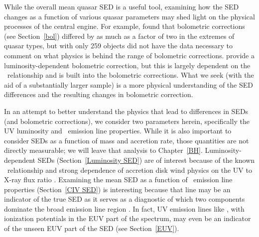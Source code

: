 While the overall mean quasar SED is a useful tool, examining how the SED changes as a function of various quasar parameters may shed light on the physical processes of the central engine.  For example, \citet{Richards:2006} found that bolometric corrections (see Section~\ref{bol}) differed by as much as a factor of two in the extremes of quasar types, but with only 259 objects \citet{Richards:2006} did not have the data necessary to comment on what physics is behind the range of bolometric corrections.
\citet{Marconi:2004} provide a luminosity-dependent bolometric correction, but this is largely dependent on the  \luvaox\ relationship and is built into the \citet{Richards:2006} bolometric corrections.  What we seek (with the aid of a substantially larger sample) is a more physical understanding of the SED differences and the resulting changes in bolometric correction.  

In an attempt to better understand the physics that lead to differences in SEDs (and bolometric corrections), we consider two parameters herein, specifically the UV luminosity and \civ\ emission line properties.  While it is also important to consider SEDs as a function of mass and accretion rate, those quantities are not directly measurable; we will leave that analysis to Chapter~\ref{BH}.
Luminosity-dependent SEDs (Section~\ref{Luminosity SED}) are of interest because of the known \luvaox\ relationship and strong dependence of accretion disk wind physics on the UV to X-ray flux ratio \citep[e.g.][]{Proga:2000}.  Examining the mean SED as a function of \civ\ emission line properties (Section~\ref{CIV SED}) is interesting because that line may be an indicator of the true SED as it serves as a diagnostic of which two components dominate the broad emission line region \citep[BELR;][]{Richards:2011,Wang:2011}.
In fact, UV emission lines like \civ, with ionization potentials in the EUV part of the spectrum, may even be an indicator of the unseen EUV part of the SED (see Section~\ref{EUV}).

